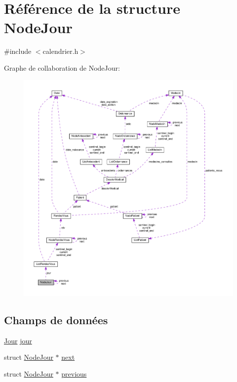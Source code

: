 \hypertarget{struct_node_jour}{\section{Référence de la structure Node\-Jour}
\label{struct_node_jour}
}


{\ttfamily \#include $<$calendrier.\-h$>$}



Graphe de collaboration de Node\-Jour\-:
\nopagebreak
\begin{figure}[H]
\begin{center}
\leavevmode
\includegraphics[width=350pt]{struct_node_jour__coll__graph}
\end{center}
\end{figure}
\subsection*{Champs de données}
\begin{DoxyCompactItemize}
\item 
\hyperlink{calendrier_8h_a99e50633bb5c551d09693a390acd33d1}{Jour} \hyperlink{struct_node_jour_a6b700af15ea48800affa955a00734b02}{jour}
\item 
struct \hyperlink{struct_node_jour}{Node\-Jour} $\ast$ \hyperlink{struct_node_jour_a4d4c1312d6c41b196a1eca69e533f9b3}{next}
\item 
struct \hyperlink{struct_node_jour}{Node\-Jour} $\ast$ \hyperlink{struct_node_jour_acaf7d4f45774acfb09a39e336ebd1af7}{previous}
\end{DoxyCompactItemize}


